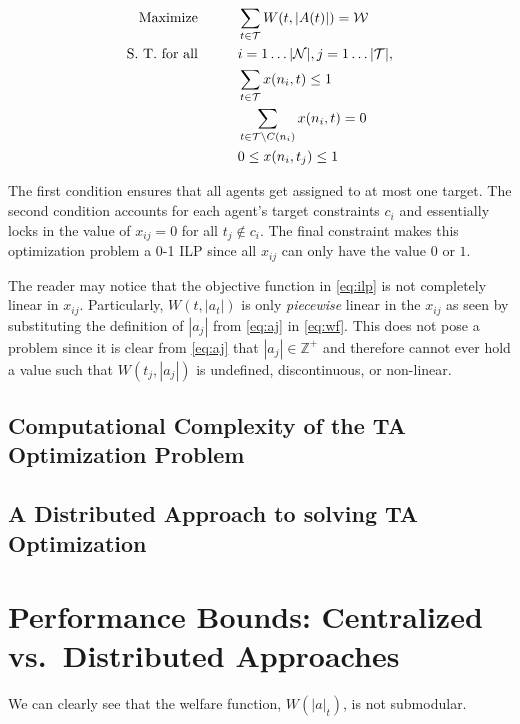 \documentclass[11pt, onecolumn, compsoc, letterpaper]{article}
\newcommand{\Pl}{\mathcal{N}} %
\newcommand{\Ta}{\mathcal{T}} %
\newcommand{\We}{\mathcal{W}} %
\begin{document}
\begin{align}\label{eq:ilp}
	\text{Maximize}\hspace{1cm} & \sum\limits_{t \in \Ta} W(t, |A(t)|) = \We\\
	\text{S. T. for all}\hspace{1cm} & i = 1\ldots|\Pl|, j = 1\ldots|\Ta|,\notag\\
	& \sum\limits_{t \in \Ta} x(n_i, t) \leq 1\notag\\
	& \sum\limits_{t \in \Ta \backslash C(n_i)} x(n_i, t) = 0\notag\\
	& 0 \leq x(n_i, t_j) \leq 1\notag
\end{align}

The first condition ensures that all agents get assigned to at most one target. The second condition accounts for each agent's target constraints $c_i$ and essentially locks in the value of $x_{ij} = 0$ for all $t_j \not\in c_i$. The final constraint makes this optimization problem a 0-1 ILP since all $x_{ij}$ can only have the value $0$ or $1$.

The reader may notice that the objective function in \eqref{eq:ilp} is not completely linear in $x_{ij}$. Particularly, $W(t, |a_t|)$ is only \emph{piecewise} linear in the $x_{ij}$ as seen by substituting the definition of $|a_j|$ from \eqref{eq:aj} in \eqref{eq:wf}. This does not pose a problem since it is clear from \eqref{eq:aj} that $|a_j| \in \mathbb{Z}^+$ and therefore cannot ever hold a value such that $W(t_j, |a_j|)$ is undefined, discontinuous, or non-linear.

\subsection{Computational Complexity of the TA Optimization Problem}



\subsection{A Distributed Approach to solving TA Optimization}



\section{Performance Bounds: Centralized vs.~Distributed Approaches}
We can clearly see that the welfare function, $W(|a|_t)$, is not submodular.
\end{document}
